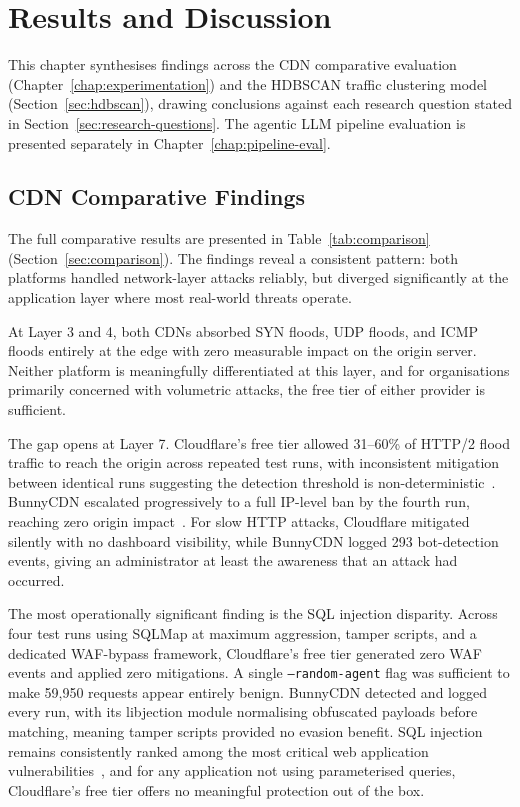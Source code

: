 \documentclass[12pt, a4paper]{report}   %
\begin{document}
\chapter{Results and Discussion}
\label{chap:results}

This chapter synthesises findings across the CDN comparative
evaluation (Chapter~\ref{chap:experimentation}) and the HDBSCAN
traffic clustering model (Section~\ref{sec:hdbscan}), drawing
conclusions against each research question stated in
Section~\ref{sec:research-questions}. The agentic LLM pipeline
evaluation is presented separately in
Chapter~\ref{chap:pipeline-eval}.

\section{CDN Comparative Findings}
\label{sec:cdn-findings}

The full comparative results are presented in
Table~\ref{tab:comparison} (Section~\ref{sec:comparison}). The
findings reveal a consistent pattern: both platforms handled
network-layer attacks reliably, but diverged significantly at
the application layer where most real-world threats operate.

At Layer 3 and 4, both CDNs absorbed SYN floods, UDP floods,
and ICMP floods entirely at the edge with zero measurable impact
on the origin server. Neither platform is meaningfully
differentiated at this layer, and for organisations primarily
concerned with volumetric attacks, the free tier of either
provider is sufficient.

The gap opens at Layer 7. Cloudflare's free tier allowed
31--60\% of HTTP/2 flood traffic to reach the origin across
repeated test runs, with inconsistent mitigation between
identical runs suggesting the detection threshold is
non-deterministic~\cite{http2-ddos}. BunnyCDN escalated
progressively to a full IP-level ban by the fourth run,
reaching zero origin impact~\cite{bunny-shield-docs}. For slow
HTTP attacks, Cloudflare mitigated silently with no dashboard
visibility, while BunnyCDN logged 293 bot-detection events,
giving an administrator at least the awareness that an attack
had occurred.

The most operationally significant finding is the SQL injection
disparity. Across four test runs using SQLMap at maximum
aggression, tamper scripts, and a dedicated WAF-bypass
framework, Cloudflare's free tier generated zero WAF events and
applied zero mitigations. A single \texttt{--random-agent} flag
was sufficient to make 59,950 requests appear entirely benign.
BunnyCDN detected and logged every run, with its libjection
module normalising obfuscated payloads before matching, meaning
tamper scripts provided no evasion benefit. SQL injection
remains consistently ranked among the most critical web
application vulnerabilities~\cite{owasp-waf}, and for any
application not using parameterised queries, Cloudflare's free
tier offers no meaningful protection out of the box.
\end{document}
